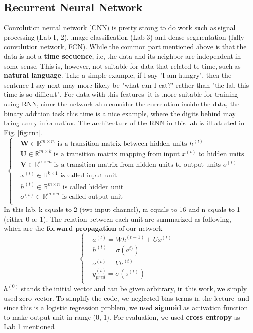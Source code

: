 \documentclass[12pt,a4paper]{article}
\begin{document}
\subsection{Recurrent Neural Network}
Convolution neural network (CNN) is pretty strong to do work such as signal processing (Lab 1, 2), image classification (Lab 3) and dense segmentation (fully convolution network, FCN). While the common part mentioned above is that the data is not a \textbf{time sequence}, i.e, the data and its neighbor are independent in some sense. This is, however, not suitable for data that related to time, such as \textbf{natural language}. Take a simple example, if I say "I am hungry", then the sentence I say next may more likely be "what can I eat?" rather than "the lab this time is so difficult". For data with this features, it is more suitable for training using RNN, since the network also consider the correlation inside the data, the binary addition task this time is a nice example, where the digits behind may bring carry information.
The architecture of the RNN in this lab is illustrated in Fig. \ref{fig:rnn}. \\
\begin{equation}
\begin{cases}

&\textbf{W} \in \mathbb{R}^{m\times m} \text{ is a transition matrix between hidden units } h^{(t)}  \\
&\textbf{U} \in \mathbb{R}^{m\times k} \text{ is a transition matrix mapping from input } x^{(t)} \text{ to hidden units} \\
&\textbf{V} \in \mathbb{R}^{n\times m} \text{ is a transition matrix from hidden units to output units } o^{(t)}\\
&x^{(t)} \in \mathbb{R}^{k\times 1} \text{ is called input unit}\\
&h^{(t)} \in \mathbb{R}^{m\times n} \text{ is called hidden unit}\\
&o^{(t)} \in \mathbb{R}^{m\times n} \text{ is called output unit}\\
\end{cases}
\end{equation}
In this lab, k equals to 2 (two input channel), m equals to 16 and n equals to 1 (either 0 or 1). The relation between each unit are summarized as following, which are the \textbf{forward propagation} of our network: %
\begin{equation}
\begin{cases}
& a^{(t)} = Wh^{(t-1)}+Ux^{(t)} \\
& h^{(t)} = \sigma (a^{t)}) \\
& o^{(t)} = Vh^{(t)} \\
& y_{pred}^{(t)} = \sigma ({o^{(t)}}) \\
\end{cases}
\end{equation}
$h^{(0)}$ stands the initial vector and can be given arbitrary, in this work, we simply used zero vector.
To simplify the code, we neglected bias terms in the lecture, and since this is a logistic regression problem, we used \textbf{sigmoid} as activation function to make output unit in range (0, 1). For evaluation, we used \textbf{cross entropy} as Lab 1 mentioned. 
\end{document}
